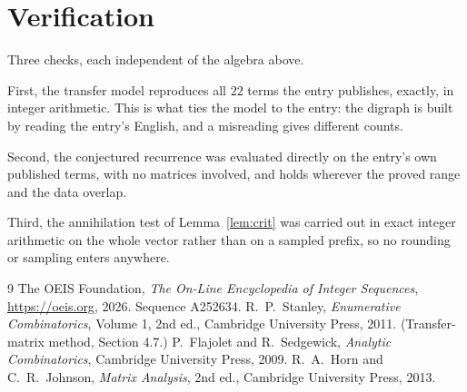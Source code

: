 \documentclass[11pt,a4paper]{article}
\theoremstyle{plain}
\theoremstyle{definition}
\begin{document}
\section{Verification}

Three checks, each independent of the algebra above.

First, the transfer model reproduces all $22$ terms the entry publishes, exactly, in
integer arithmetic. This is what ties the model to the entry: the digraph is built by reading
the entry's English, and a misreading gives different counts.

Second, the conjectured recurrence was evaluated directly on the entry's own published terms,
with no matrices involved, and holds wherever the proved range and the data overlap.

Third, the annihilation test of Lemma~\ref{lem:crit} was carried out in exact integer
arithmetic on the whole vector rather than on a sampled prefix, so no rounding or sampling
enters anywhere.

\begin{thebibliography}{9}
 The OEIS Foundation, \emph{The On-Line Encyclopedia of Integer
Sequences}, \url{https://oeis.org}, 2026. Sequence A252634.
 R.~P.~Stanley, \emph{Enumerative Combinatorics}, Volume 1, 2nd ed.,
Cambridge University Press, 2011. (Transfer-matrix method, Section 4.7.)
 P.~Flajolet and R.~Sedgewick, \emph{Analytic Combinatorics}, Cambridge
University Press, 2009.
 R.~A.~Horn and C.~R.~Johnson, \emph{Matrix Analysis}, 2nd ed., Cambridge
University Press, 2013.
\end{thebibliography}
\end{document}

